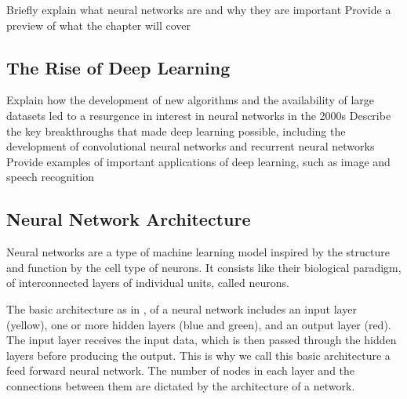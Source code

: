 Briefly explain what neural networks are and why they are important
Provide a preview of what the chapter will cover

% 

\subsection{The Rise of Deep Learning}

Explain how the development of new algorithms and the availability of large datasets led to a resurgence in interest in neural networks in the 2000s
Describe the key breakthroughs that made deep learning possible, including the development of convolutional neural networks and recurrent neural networks
Provide examples of important applications of deep learning, such as image and speech recognition

\subsection{Neural Network Architecture}


Neural networks are a type of machine learning model inspired by the structure and function by the cell type of neurons. It consists like their biological paradigm, of interconnected layers of individual units, called neurons.

The basic architecture as in , of a neural network includes an input layer (yellow), one or more hidden layers (blue and green), and an output layer (red). The input layer receives the input data, which is then passed through the hidden layers before producing the output. This is why we call this basic architecture a feed forward neural network. The number of nodes in each layer and the connections between them are dictated by the architecture of a network.

